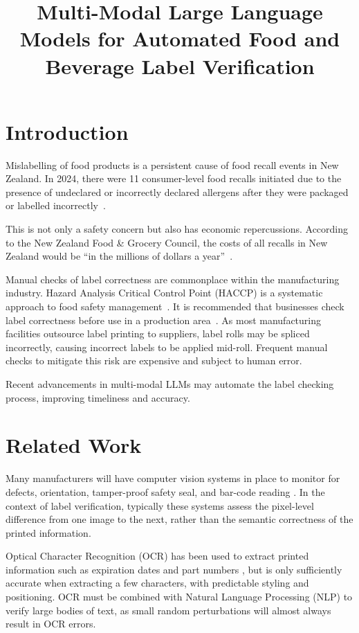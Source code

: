 \documentclass[conference]{IEEEtran}
\title{Multi-Modal Large Language Models for Automated Food and Beverage Label Verification}
\author{
    \IEEEauthorblockN{Lennox Crowe}
    \IEEEauthorblockA{
        \textit{Victoria University of Wellington}
    }
}
\begin{document}
\maketitle

\section{Introduction}
Mislabelling of food products is a persistent cause of food recall events in New Zealand. In 2024, there were 11 consumer-level food recalls initiated due to the presence of undeclared or incorrectly declared allergens after they were packaged or labelled incorrectly~\cite{mpi2024}.

This is not only a safety concern but also has economic repercussions. According to the New Zealand Food \& Grocery Council, the costs of all recalls in New Zealand would be “in the millions of dollars a year”~\cite{fgc2025}.

Manual checks of label correctness are commonplace within the manufacturing industry. Hazard Analysis Critical Control Point (HACCP) is a systematic approach to food safety management~\cite{fda2022}. It is recommended that businesses check label correctness before use in a production area~\cite{mentor2025}. As most manufacturing facilities outsource label printing to suppliers, label rolls may be spliced incorrectly, causing incorrect labels to be applied mid-roll. Frequent manual checks to mitigate this risk are expensive and subject to human error.

Recent advancements in multi-modal LLMs may automate the label checking process, improving timeliness and accuracy.

\section{Related Work}
Many manufacturers will have computer vision systems in place to monitor for defects, orientation, tamper-proof safety seal, and bar-code reading \cite{cognex2025}. In the context of label verification, typically these systems assess the pixel-level difference from one image to the next, rather than the semantic correctness of the printed information.

Optical Character Recognition (OCR) has been used to extract printed information such as expiration dates and part numbers \cite{keyence2025}, but is only sufficiently accurate when extracting a few characters, with predictable styling and positioning. OCR must be combined with Natural Language Processing (NLP) to verify large bodies of text, as small random perturbations will almost always result in OCR errors. 
\end{document}

